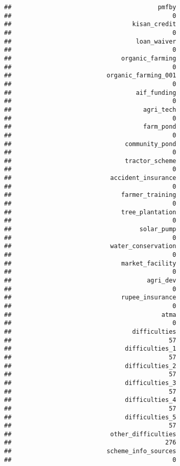 \documentclass[
]{article}
\begin{document}
\begin{verbatim}
##                                        pmfby 
##                                            0 
##                                 kisan_credit 
##                                            0 
##                                  loan_waiver 
##                                            0 
##                              organic_farming 
##                                            0 
##                          organic_farming_001 
##                                            0 
##                                  aif_funding 
##                                            0 
##                                    agri_tech 
##                                            0 
##                                    farm_pond 
##                                            0 
##                               community_pond 
##                                            0 
##                               tractor_scheme 
##                                            0 
##                           accident_insurance 
##                                            0 
##                              farmer_training 
##                                            0 
##                              tree_plantation 
##                                            0 
##                                   solar_pump 
##                                            0 
##                           water_conservation 
##                                            0 
##                              market_facility 
##                                            0 
##                                     agri_dev 
##                                            0 
##                              rupee_insurance 
##                                            0 
##                                         atma 
##                                            0 
##                                 difficulties 
##                                           57 
##                               difficulties_1 
##                                           57 
##                               difficulties_2 
##                                           57 
##                               difficulties_3 
##                                           57 
##                               difficulties_4 
##                                           57 
##                               difficulties_5 
##                                           57 
##                           other_difficulties 
##                                          276 
##                          scheme_info_sources 
##                                            0 

\end{verbatim}
\end{document}
